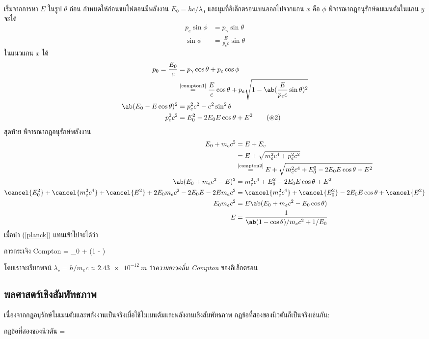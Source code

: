 \begin{soln}
    เริ่มจากการหา $E$ ในรูป $\theta$ ก่อน กำหนดให้ก่อนชนโฟตอนมีพลังงาน $E_0 = hc/\lambda_0$ และมุมที่อิเล็กตรอนเบนออกไปจากแกน $x$ คือ $\phi$ พิจารณากฎอนุรักษ์ดมเมนตัมในแกน $y$ จะได้
    \begin{align*}
        p_e\sin\phi &= p_\gamma\sin\theta \\
        \sin\phi &= \frac{E}{p_ec}\sin\theta\tag{$\circledast$1}\label{compton1}
    \end{align*}
    ในแนวแกน $x$ ได้
    \begin{align*}
        p_0 = \frac{E_0}{c} &= p_\gamma\cos\theta + p_e\cos\phi \\
        &\overset{\text{\ref{compton1}}}{=} \frac{E}{c}\cos\theta + p_e\sqrt{1 - \ab(\frac{E}{p_ec}\sin\theta)^2}\\
        \ab(E_0 - E\cos\theta)^2 &= p_e^2c^2 - e^2\sin^2\theta\\
        p_e^2c^2 &= E_0^2 -2E_0E\cos\theta + E^2\tag{$\circledast$2}\label{compton2}
    \end{align*}
    สุดท้าย พิจารณากฎอนุรักษ์พลังงาน
    \begin{align}
        E_0 + m_ec^2 &= E + E_e\notag\\
        &= E + \sqrt{m_e^2c^4 + p_e^2c^2}\notag\\
        &\overset{\text{\ref{compton2}}}{=} E + \sqrt{m_e^2c^4 + E_0^2 - 2E_0E\cos\theta + E^2}\notag\\
        \ab(E_0 + m_ec^2 - E)^2 &= m_e^2c^4 + E_0^2 - 2E_0E\cos\theta + E^2\notag\\
        \cancel{E_0^2} + \cancel{m_e^2c^4} + \cancel{E^2} + 2E_0m_ec^2 - 2E_0E - 2 Em_ec^2 &= \cancel{m_e^2c^4} + \cancel{E_0^2} - 2E_0E\cos\theta + \cancel{E^2}\notag\\
        E_0m_ec^2 &= E\ab(E_0 + m_ec^2 - E_0\cos\theta)\notag\\
        E &= \frac{1}{\ab(1 - \cos\theta)/m_ec^2 + 1/E_0}
    \end{align}
    เมื่อนำ (\ref{planck}) แทนเข้าไปจะได้ว่า
    \begin{eqbox}{การกระเจิง Compton}
        \lambda = \lambda_0 + \ab(1 - \cos\theta)
    \end{eqbox}
    โดยเราจะเรียกพจน์ $\lambda_c = h/m_ec \approx \qty{2.43e-12}{m}$ ว่า\emph{ความยาวคลื่น Compton} ของอิเล็กตรอน
\end{soln}

\subsection{พลศาสตร์เชิงสัมพัทธภาพ}

เนื่องจากกฎอนุรักษ์โมเมนตัมและพลังงานเป็นจริงเมื่อใช้โมเมนตัมและพลังงานเชิงสัมพัทธภาพ กฎข้อที่สองของนิวตันก็เป็นจริงเช่นกัน:
\begin{ieqbox}{กฎข้อที่สองของนิวตัน}
     = 
\end{ieqbox}